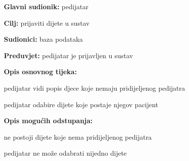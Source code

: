                     \noindent {}
					\begin{packed_item}
	
						\item \textbf{Glavni sudionik: }pedijatar
						\item  \textbf{Cilj:} prijaviti dijete u sustav
						\item  \textbf{Sudionici:} baza podataka
						\item  \textbf{Preduvjet:} pedijatar je prijavljen u sustav
						\item  \textbf{Opis osnovnog tijeka:}
						
						\item[] \begin{packed_enum}
	
							\item pedijatar vidi popis djece koje nemaju pridijeljenog pedijatra
							\item pedijatar odabire dijete koje postaje njegov pacijent

						\end{packed_enum}
						
						\item  \textbf{Opis mogućih odstupanja:}
						
						\item[] \begin{packed_item}
	
							\item[1.a] ne postoji dijete koje nema pridijeljenog pedijatra 
							\item[] \begin{packed_enum}
								\item pedijatar ne može odabrati nijedno dijete
							\end{packed_enum}
							
						\end{packed_item}
					\end{packed_item}

